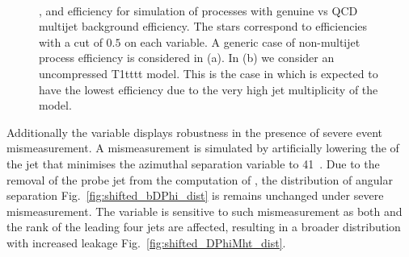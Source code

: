 \begin{figure}[!h]
 \centering
 ~
  \\
 \caption{\bdphi, \dphimhtj and \dphimhtjall efficiency for simulation of processes with genuine
 \met vs QCD multijet background efficiency. The stars correspond to
 efficiencies with a cut of $0.5$ on each variable. A generic case of
 non-multijet process efficiency is considered in (a). In (b) we
 consider an uncompressed T1tttt model. This is the case in which \bdphi is
 expected to have the lowest efficiency due to the very high jet
 multiplicity of the model.}
 \label{fig:bDPhi_roc}
\end{figure}

Additionally the \bdphi variable displays robustness in the presence
of severe event mismeasurement. A mismeasurement is simulated by
artificially lowering the \pt of the jet that minimises the azimuthal
separation variable to 41~\gev. Due
to the removal of the probe jet from the computation of \bdphi, the
distribution of angular separation Fig.~\ref{fig:shifted_bDPhi_dist}
is remains unchanged under severe mismeasurement. The \dphimhtj
variable is sensitive to such mismeasurement as both \mht and the rank
of the leading four jets are affected, resulting in a broader
distribution with increased leakage
Fig.~\ref{fig:shifted_DPhiMht_dist}.

